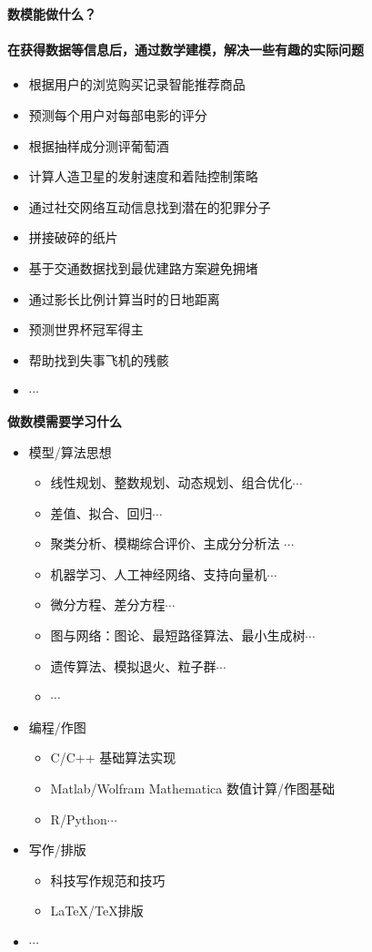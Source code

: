 \documentclass[xcolor={usenames,dvipsnames}]{beamer}
\begin{document}
\begin{frame}{\textbf{数模能做什么？}}
	\framesubtitle{在获得数据等信息后，通过数学建模，解决一些有趣的实际问题}
	\begin{itemize}
		\item 根据用户的浏览购买记录智能推荐商品
		\item 预测每个用户对每部电影的评分
		\item 根据抽样成分测评葡萄酒
		\item 计算人造卫星的发射速度和着陆控制策略
		\item 通过社交网络互动信息找到潜在的犯罪分子
		\item 拼接破碎的纸片
		\item 基于交通数据找到最优建路方案避免拥堵
		\item 通过影长比例计算当时的日地距离
		\item 预测世界杯冠军得主
		\item 帮助找到失事飞机的残骸
		\item $ \cdots $
	\end{itemize}
	
\end{frame}

\begin{frame}{\textbf{做数模需要学习什么}}\label{content}
	\begin{itemize}
	\item 模型/算法思想 
	
	\begin{itemize}
		\item 线性规划、整数规划、动态规划、组合优化$\cdots$
		\item 差值、拟合、回归$\cdots$
		\item 聚类分析、模糊综合评价、主成分分析法 $\cdots$
		\item 机器学习、人工神经网络、支持向量机$\cdots$
		\item 微分方程、差分方程$\cdots$
		\item 图与网络：图论、最短路径算法、最小生成树$\cdots$
		\item 遗传算法、模拟退火、粒子群$\cdots$
		\item $\cdots$
	\end{itemize}
	
	\item 编程/作图
	\begin{itemize}
		\item C/C++ 基础算法实现
		\item Matlab/Wolfram Mathematica 数值计算/作图基础
		\item R/Python$\cdots$
	\end{itemize}
	
	\item 写作/排版
	\begin{itemize}
		\item 科技写作规范和技巧
		\item  \LaTeX/\TeX 排版
	\end{itemize}
	\item $\cdots$
	\end{itemize}
	
\end{frame}
\end{document}
